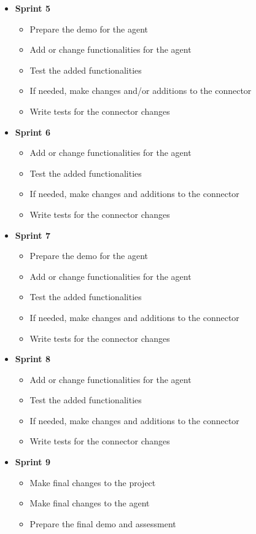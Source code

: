 \begin{itemize}
\item\textbf{Sprint 5}

\begin{itemize}
  \item Prepare the demo for the agent
  \item Add or change functionalities for the agent
  \item Test the added functionalities
  \item If needed, make changes and/or additions to the connector
  \item Write tests for the connector changes
\end{itemize}


\item\textbf{Sprint 6}

\begin{itemize}
  \item Add or change functionalities for the agent
  \item Test the added functionalities
  \item If needed, make changes and additions to the connector
  \item Write tests for the connector changes
\end{itemize}


\item\textbf{Sprint 7}

\begin{itemize}
  \item Prepare the demo for the agent
  \item Add or change functionalities for the agent
  \item Test the added functionalities
  \item If needed, make changes and additions to the connector
  \item Write tests for the connector changes
\end{itemize}

\newpage
\item\textbf{Sprint 8}

\begin{itemize}
  \item Add or change functionalities for the agent
  \item Test the added functionalities
  \item If needed, make changes and additions to the connector
  \item Write tests for the connector changes
\end{itemize}


\item\textbf{Sprint 9}

\begin{itemize}
  \item Make final changes to the project
  \item Make final changes to the agent
  \item Prepare the final demo and assessment
\end{itemize}
\end{itemize}

